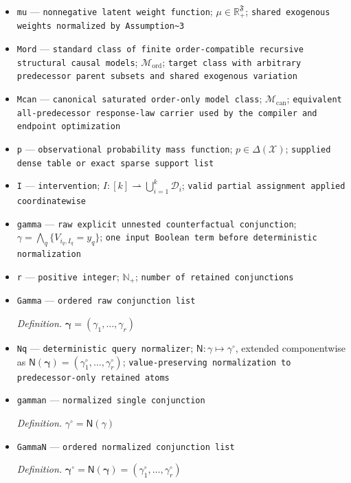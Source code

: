 \documentclass{article}
\begin{document}
\begin{itemize}
  \item \texttt{mu} --- \texttt{nonnegative latent weight function}; \(\mu\in\mathbb R_{+}^{\mathfrak F}\); \texttt{shared exogenous weights normalized by Assumption\textasciitilde{}3}
  \item \texttt{Mord} --- \texttt{standard class of finite order-\allowbreak{}compatible recursive structural causal models}; \(\mathcal M_{\mathrm{ord}}\); \texttt{target class with arbitrary predecessor parent subsets and shared exogenous variation}
  \item \texttt{Mcan} --- \texttt{canonical saturated order-\allowbreak{}only model class}; \(\mathcal M_{\mathrm{can}}\); \texttt{equivalent all-\allowbreak{}predecessor response-\allowbreak{}law carrier used by the compiler and endpoint optimization}
  \item \texttt{p} --- \texttt{observational probability mass function}; \(p\in\Delta(\mathcal X)\); \texttt{supplied dense table or exact sparse support list}
  \item \texttt{I} --- \texttt{intervention}; \(I:[k]\rightharpoonup\bigcup_{i=1}^k\mathcal D_i\); \texttt{valid partial assignment applied coordinatewise}
  \item \texttt{gamma} --- \texttt{raw explicit unnested counterfactual conjunction}; \(\gamma=\bigwedge_q\{V_{i_q,I_q}=y_q\}\); \texttt{one input Boolean term before deterministic normalization}
  \item \texttt{r} --- \texttt{positive integer}; \(\mathbb N_{+}\); \texttt{number of retained conjunctions}
  \item \texttt{Gamma} --- \texttt{ordered raw conjunction list}
  \par\smallskip\noindent\emph{Definition.} \(\boldsymbol\gamma=(\gamma_1,\ldots,\gamma_r)\)
  \item \texttt{Nq} --- \texttt{deterministic query normalizer}; \(\mathsf N:\gamma\mapsto\gamma^{\circ}\), extended componentwise as \(\mathsf N(\boldsymbol\gamma)=(\gamma_1^{\circ},\ldots,\gamma_r^{\circ})\); \texttt{value-\allowbreak{}preserving normalization to predecessor-\allowbreak{}only retained atoms}
  \item \texttt{gamman} --- \texttt{normalized single conjunction}
  \par\smallskip\noindent\emph{Definition.} \(\gamma^{\circ}=\mathsf N(\gamma)\)
  \item \texttt{GammaN} --- \texttt{ordered normalized conjunction list}
  \par\smallskip\noindent\emph{Definition.} \(\boldsymbol\gamma^{\circ}=\mathsf N(\boldsymbol\gamma)=(\gamma_1^{\circ},\ldots,\gamma_r^{\circ})\)

\end{itemize}
\end{document}

